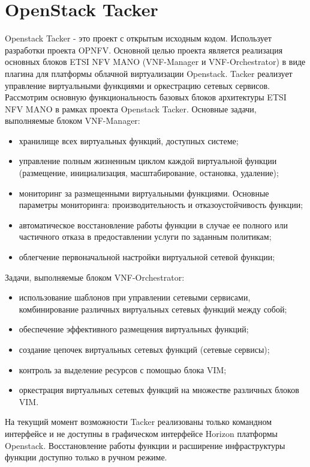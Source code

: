 \documentclass[oneside,final,14pt,a4paper]{extreport}
\begin{document}
\section{OpenStack Tacker}
Openstack Tacker - это проект с открытым исходным кодом. Использует разработки проекта OPNFV. Основной целью проекта является реализация основных блоков ETSI NFV MANO (VNF-Manager и VNF-Orchestrator) в виде плагина для платформы облачной виртуализации Openstack. Tacker реализует управление виртуальными функциями и оркестрацию сетевых сервисов.
	Рассмотрим основную функциональность базовых блоков архитектуры ETSI NFV MANO в рамках проекта Openstack Tacker. Основные задачи, выполняемые блоком VNF-Manager:
\begin{itemize}
	\item хранилище всех виртуальных функций, доступных системе;
	\item управление полным жизненным циклом каждой виртуальной функции (размещение, инициализация, масштабирование, остановка, удаление);
	\item мониторинг за размещенными виртуальными функциями. Основные параметры мониторинга: производительность и отказоустойчивость функции;
	\item автоматическое восстановление работы функции в случае ее полного или частичного отказа в предоставлении услуги по заданным политикам;
	\item облегчение первоначальной настройки виртуальной сетевой функции;
\end{itemize}
Задачи, выполняемые блоком VNF-Orchestrator:
\begin{itemize}
	\item использование шаблонов при управлении сетевыми сервисами, комбинирование различных виртуальных сетевых функций между собой;
	\item обеспечение эффективного размещения виртуальных функций;
	\item создание цепочек виртуальных сетевых функций (сетевые сервисы);
	\item контроль за выделение ресурсов с помощью блока VIM;
	\item оркестрация виртуальных сетевых функций на множестве различных блоков VIM.
\end{itemize}

На текущий момент возможности Tacker реализованы только командном интерфейсе и не доступны в графическом интерфейсе Horizon платформы Openstack.\cite{tacker-official} 
Восстановление работы функции и расширение инфраструктуры функции доступно только в ручном режиме.
\end{document}
